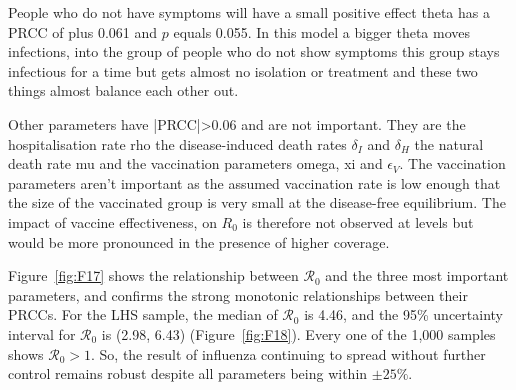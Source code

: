 \documentclass[12pt,a4paper]{article}
\theoremstyle{definition}
\theoremstyle{remark}
\begin{document}
People who do not have symptoms will have a small positive effect theta has a PRCC of plus 0.061 and $p$ equals 0.055. In this model a bigger theta moves infections, into the group of people who do not show symptoms this group stays infectious for a time but gets almost no isolation or treatment and these two things almost balance each other out.

Other parameters have |PRCC|>0.06 and are not important. They are the hospitalisation rate rho the disease-induced death rates $\delta_I$ and $\delta_H$ the natural death rate mu and the vaccination parameters omega, xi and $\epsilon_V$. The vaccination parameters aren't important as the assumed vaccination rate is low enough that the size of the vaccinated group is very small at the disease-free equilibrium. The impact of vaccine effectiveness, on $R_0$ is therefore not observed at levels but would be more pronounced in the presence of higher coverage.

Figure~\ref{fig:F17} shows the relationship between $\mathcal{R}_0$ and the three most important parameters, and confirms the strong monotonic relationships between their PRCCs. For the LHS sample, the median of $\mathcal{R}_0$ is 4.46, and the 95\% uncertainty interval for $\mathcal{R}_0$ is (2.98, 6.43) (Figure~\ref{fig:F18}). Every one of the 1,000 samples shows $\mathcal{R}_0 > 1$. So, the result of influenza continuing to spread without further control remains robust despite all parameters being within $\pm 25 \%$.
\end{document}
